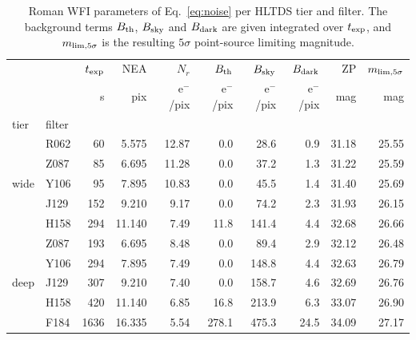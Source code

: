 \begin{table}[ht]
\centering
\small
\caption{Roman WFI parameters of Eq.~\ref{eq:noise} per HLTDS tier and filter. The background terms $B_{\rm th}$, $B_{\rm sky}$ and $B_{\rm dark}$ are given integrated over $t_{\rm exp}$, and $m_{\rm lim,5\sigma}$ is the resulting $5\sigma$ point-source limiting magnitude.}
\label{tab:values}
\begin{tabular}{llrrrrrrrr}
\toprule
 &  & $t_{\rm exp}$ & NEA & $N_r$ & $B_{\rm th}$ & $B_{\rm sky}$ & $B_{\rm dark}$ & ZP & $m_{\rm lim,5\sigma}$ \\
 &  & s & pix & e$^-$/pix & e$^-$/pix & e$^-$/pix & e$^-$/pix & mag & mag \\
tier & filter &  &  &  &  &  &  &  &  \\
\midrule
\multirow[t]{5}{*}{wide} & R062 & 60 & 5.575 & 12.87 & 0.0 & 28.6 & 0.9 & 31.18 & 25.55 \\
 & Z087 & 85 & 6.695 & 11.28 & 0.0 & 37.2 & 1.3 & 31.22 & 25.59 \\
 & Y106 & 95 & 7.895 & 10.83 & 0.0 & 45.5 & 1.4 & 31.40 & 25.69 \\
 & J129 & 152 & 9.210 & 9.17 & 0.0 & 74.2 & 2.3 & 31.93 & 26.15 \\
 & H158 & 294 & 11.140 & 7.49 & 11.8 & 141.4 & 4.4 & 32.68 & 26.66 \\
\midrule
\multirow[t]{5}{*}{deep} & Z087 & 193 & 6.695 & 8.48 & 0.0 & 89.4 & 2.9 & 32.12 & 26.48 \\
 & Y106 & 294 & 7.895 & 7.49 & 0.0 & 148.8 & 4.4 & 32.63 & 26.79 \\
 & J129 & 307 & 9.210 & 7.40 & 0.0 & 158.7 & 4.6 & 32.69 & 26.76 \\
 & H158 & 420 & 11.140 & 6.85 & 16.8 & 213.9 & 6.3 & 33.07 & 26.90 \\
 & F184 & 1636 & 16.335 & 5.54 & 278.1 & 475.3 & 24.5 & 34.09 & 27.17 \\
\bottomrule
\end{tabular}
\end{table}
